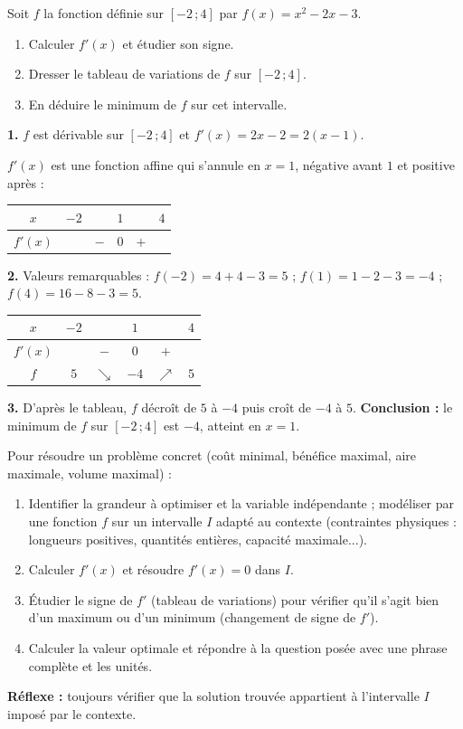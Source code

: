 \documentclass[11pt]{article}
\begin{document}
\begin{exoresolu}
Soit $f$ la fonction définie sur $[-2\,;4]$ par $f(x)=x^{2}-2x-3$.
\begin{enumerate}
\item Calculer $f'(x)$ et étudier son signe.
\item Dresser le tableau de variations de $f$ sur $[-2\,;4]$.
\item En déduire le minimum de $f$ sur cet intervalle.
\end{enumerate}
\tcblower
\textbf{1.} $f$ est dérivable sur $[-2\,;4]$ et $f'(x)=2x-2=2(x-1)$.

$f'(x)$ est une fonction affine qui s'annule en $x=1$, négative avant $1$ et positive après :
\begin{center}
\begin{tabular}{|c|ccccc|}\hline
$x$ & $-2$ & & $1$ & & $4$ \\ \hline
$f'(x)$ & & $-$ & $0$ & $+$ & \\ \hline
\end{tabular}
\end{center}

\textbf{2.} Valeurs remarquables : $f(-2)=4+4-3=5$ ; $f(1)=1-2-3=-4$ ; $f(4)=16-8-3=5$.
\begin{center}
\begin{tabular}{|c|ccccc|}\hline
$x$ & $-2$ & & $1$ & & $4$ \\ \hline
$f'(x)$ & & $-$ & $0$ & $+$ & \\ \hline
$f$ & $5$ & $\searrow$ & $-4$ & $\nearrow$ & $5$ \\ \hline
\end{tabular}
\end{center}

\textbf{3.} D'après le tableau, $f$ décroît de $5$ à $-4$ puis croît de $-4$ à $5$. \textbf{Conclusion :} le minimum de $f$ sur $[-2\,;4]$ est $-4$, atteint en $x=1$.
\end{exoresolu}

\begin{methode}
Pour résoudre un problème concret (coût minimal, bénéfice maximal, aire maximale, volume maximal) :
\begin{enumerate}
\item Identifier la grandeur à optimiser et la variable indépendante ; modéliser par une fonction $f$ sur un intervalle $I$ adapté au contexte (contraintes physiques : longueurs positives, quantités entières, capacité maximale...).
\item Calculer $f'(x)$ et résoudre $f'(x)=0$ dans $I$.
\item Étudier le signe de $f'$ (tableau de variations) pour vérifier qu'il s'agit bien d'un maximum ou d'un minimum (changement de signe de $f'$).
\item Calculer la valeur optimale et répondre à la question posée avec une phrase complète et les unités.
\end{enumerate}
\textbf{Réflexe :} toujours vérifier que la solution trouvée appartient à l'intervalle $I$ imposé par le contexte.
\end{methode}
\end{document}
